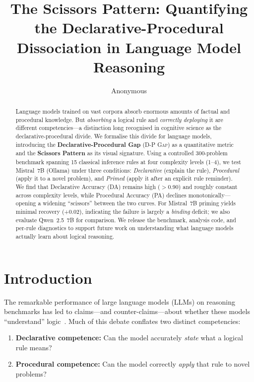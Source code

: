 \documentclass{article}
\title{The Scissors Pattern: Quantifying the Declarative-Procedural\\
Dissociation in Language Model Reasoning}
\author{Anonymous}
\date{}
\newcommand{\dpgap}{\textsc{D-P Gap}}
\newcommand{\da}{\textsc{DA}}
\newcommand{\pa}{\textsc{PA}}
\begin{document}
\maketitle

\begin{abstract}
Language models trained on vast corpora absorb enormous amounts of
factual and procedural knowledge.
But \emph{absorbing} a logical rule and \emph{correctly deploying} it
are different competencies---a distinction long recognised in cognitive
science as the declarative-procedural divide.
We formalise this divide for language models, introducing the
\textbf{Declarative-Procedural Gap} (\dpgap{}) as a quantitative
metric and the \textbf{Scissors Pattern} as its visual signature.
Using a controlled 300-problem benchmark spanning 15 classical
inference rules at four complexity levels (1--4), we test Mistral~7B (Ollama)
under three conditions: \emph{Declarative} (explain the rule),
\emph{Procedural} (apply it to a novel problem), and \emph{Primed}
(apply it after an explicit rule reminder).
We find that Declarative Accuracy (\da{}) remains high ($>$0.90) and
roughly constant across complexity levels, while Procedural Accuracy
(\pa{}) declines monotonically---opening a widening ``scissors''
between the two curves.
For Mistral~7B priming yields minimal recovery (+0.02), indicating the
failure is largely a \emph{binding} deficit; we also evaluate Qwen~2.5~7B for comparison.
We release the benchmark, analysis code, and per-rule diagnostics to
support future work on understanding what language models actually
learn about logical reasoning.
\end{abstract}

\section{Introduction}
\label{sec:intro}

The remarkable performance of large language models (LLMs) on
reasoning benchmarks has led to claims---and counter-claims---about
whether these models ``understand''
logic~\cite{hopp2024conditional,saparov2023prontoqa}.
Much of this debate conflates two distinct competencies:

\begin{enumerate}
    \item \textbf{Declarative competence:} Can the model accurately
    \emph{state} what a logical rule means?
    \item \textbf{Procedural competence:} Can the model correctly
    \emph{apply} that rule to novel problems?
\end{enumerate}
\end{document}
